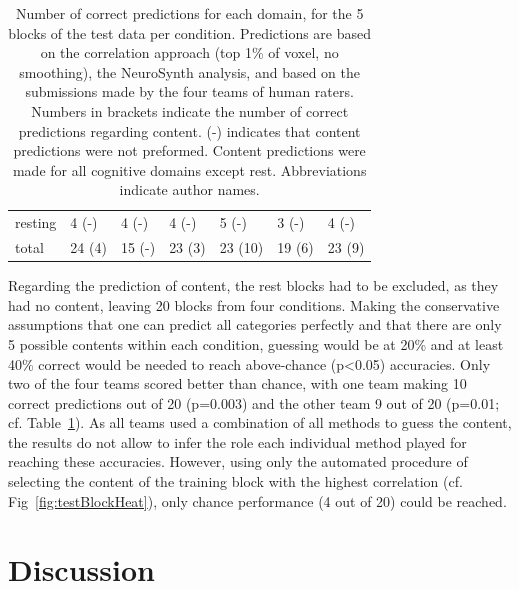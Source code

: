\documentclass[fleqn,10pt]{SelfArx} %
\begin{document}
\begin{table}[htbp]
\begin{tabularx}{\textwidth}{XXXXXXX}
				resting        & 4 (-) & 4 (-)           &	4 (-)\newline &	5 (-)\newline &	3 (-)\newline & 	4 (-)\newline \\
				total & 24 (4) & 15 (-) &	23 (3) &	23 (10) &	19 (6) &	23 (9) \\
				
				\hline
			\end{tabularx}
			\caption*{Number of correct predictions for each domain, for the 5 blocks of the test data per condition. Predictions are based on the correlation approach (top 1\% of voxel, no smoothing), the NeuroSynth analysis, and based on the submissions made by the four teams of human raters. Numbers in brackets indicate the number of correct predictions regarding content. (-) indicates that content predictions were not preformed. Content predictions were made for all cognitive domains except rest. Abbreviations indicate author names.}
			\label{tab:testTab}
		\end{table}
		
Regarding the prediction of content, the rest blocks had to be excluded, as they had no content, leaving 20 blocks from four conditions. Making the conservative assumptions that one can predict all categories perfectly and that there are only 5 possible contents within each condition, guessing would be at 20\% and at least 40\% correct would be needed to reach above-chance (p<0.05) accuracies. Only two of the four teams scored better than chance, with one team making 10 correct predictions out of 20 (p=0.003) and the other team 9 out of 20 (p=0.01; cf. Table~\ref{tab:testTab}). As all teams used a combination of all methods to guess the content, the results do not allow to infer the role each individual method played for reaching these accuracies. However, using only the automated procedure of selecting the content of the training block with the highest correlation (cf. Fig~\ref{fig:testBlockHeat}), only chance performance (4 out of 20) could be reached.

\section{Discussion}
\end{document}
